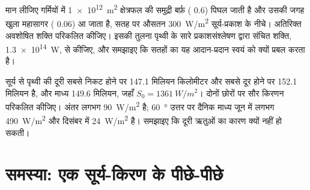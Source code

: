\begin{exercise}[$\star\star\star$]\label{exo:g10:earth-energy-budget:14}
मान लीजिए गर्मियों में \qty{1e12}{m^2} क्षेत्रफल की समुद्री बर्फ़ ( 0.6)
पिघल जाती है और उसकी जगह खुला महासागर ( 0.06) आ जाता है, सतह पर औसतन
\qty{300}{W/m^2} सूर्य-प्रकाश के नीचे। अतिरिक्त अवशोषित शक्ति परिकलित
कीजिए। इसकी तुलना पृथ्वी के सारे प्रकाशसंश्लेषण द्वारा संचित शक्ति,
\qty{1.3e14}{W}, से कीजिए, और समझाइए कि सतहों का यह आदान-प्रदान
स्वयं को क्यों प्रबल करता है।
\end{exercise}

\begin{exercise}[$\star\star\star$]\label{exo:g10:earth-energy-budget:15}
सूर्य से पृथ्वी की दूरी सबसे निकट होने पर \num{147.1} मिलियन किलोमीटर और सबसे दूर होने
पर \num{152.1} मिलियन है, और माध्य
\num{149.6} मिलियन, जहाँ $S_0 = \qty{1361}{W/m^2}$। दोनों छोरों पर सौर
किरणन परिकलित कीजिए। अंतर लगभग
\qty{90}{W/m^2} है; \qty{60}{\degree} उत्तर पर दैनिक माध्य  जून में लगभग
\qty{490}{W/m^2} और दिसंबर में \qty{24}{W/m^2} है। समझाइए कि
दूरी ऋतुओं का कारण क्यों नहीं हो सकती।
\end{exercise}

\section{समस्या: एक सूर्य-किरण के पीछे-पीछे}

